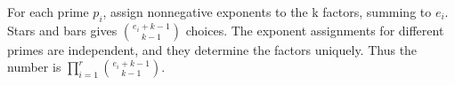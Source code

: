 For each prime $p_i$, assign nonnegative exponents to the k factors, summing to $e_i$. Stars and bars gives $\binom{e_i+k-1}{k-1}$ choices. The exponent assignments for different primes are independent, and they determine the factors uniquely. Thus the number is $\boxed{\prod_{i=1}^r\binom{e_i+k-1}{k-1}}$.
